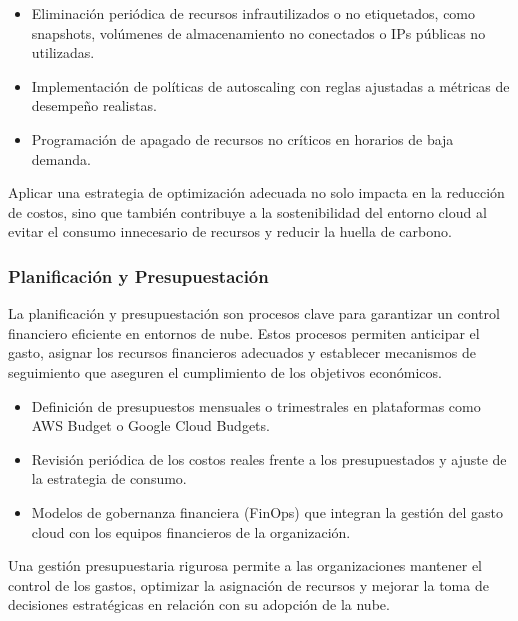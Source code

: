 {                \begin{itemize}
                    \item Eliminación periódica de recursos infrautilizados o no etiquetados, como snapshots, volúmenes de almacenamiento no conectados o IPs públicas no utilizadas.
                    \item Implementación de políticas de autoscaling con reglas ajustadas a métricas de desempeño realistas.
                    \item Programación de apagado de recursos no críticos en horarios de baja demanda.
                \end{itemize}
                
                Aplicar una estrategia de optimización adecuada no solo impacta en la reducción de costos, sino que también contribuye a la sostenibilidad del entorno cloud al evitar el consumo innecesario de recursos y reducir la huella de carbono.
                
            \subsubsection{Planificación y Presupuestación}
                La planificación y presupuestación son procesos clave para garantizar un control financiero eficiente en entornos de nube. Estos procesos permiten anticipar el gasto, asignar los recursos financieros adecuados y establecer mecanismos de seguimiento que aseguren el cumplimiento de los objetivos económicos.
                
                \begin{itemize}
                    \item Definición de presupuestos mensuales o trimestrales en plataformas como AWS Budget o Google Cloud Budgets.
                    \item Revisión periódica de los costos reales frente a los presupuestados y ajuste de la estrategia de consumo.
                    \item Modelos de gobernanza financiera (FinOps) que integran la gestión del gasto cloud con los equipos financieros de la organización.
                \end{itemize}
                
                Una gestión presupuestaria rigurosa permite a las organizaciones mantener el control de los gastos, optimizar la asignación de recursos y mejorar la toma de decisiones estratégicas en relación con su adopción de la nube.
                
}
